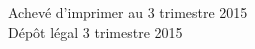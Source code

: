 \cleardoublepage
\mbox{}
\vfill

{\scriptsize
\begin{center}
Achevé d'imprimer au 3 trimestre 2015 \\
Dépôt légal\frcolon{} 3 trimestre 2015
\end{center}
}
\enlargethispage{\footskip}


